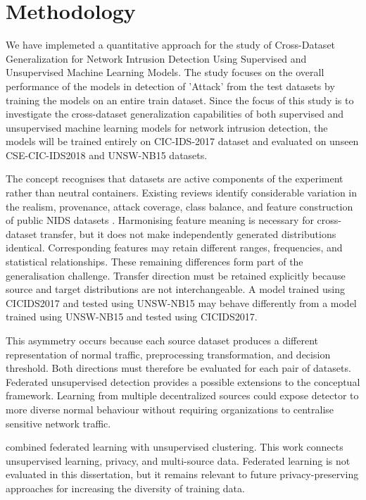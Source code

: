 \chapter{Methodology}
We have implemeted a quantitative approach for the study of Cross-Dataset Generalization for Network Intrusion Detection Using Supervised and Unsupervised Machine Learning Models. 
The study focuses on the overall performance of the models in detection of 'Attack' from the test datasets by training the models on an entire train dataset. Since the focus of this 
study is to investigate the cross-dataset generalization capabilities of both supervised and unsupervised machine learning models for network intrusion detection, the models will be 
trained entirely on CIC-IDS-2017 dataset and evaluated on unseen CSE-CIC-IDS2018 and UNSW-NB15 datasets.

The concept recognises that datasets are active components of the experiment rather than neutral containers. Existing reviews identify 
considerable variation in the realism, provenance, attack coverage, class balance, and feature construction of public NIDS datasets 
\cite{Ring2019,Thakkar2020,Kenyon2020,Goldschmidt2025,Pinto2025}. Harmonising feature meaning is necessary for cross-dataset transfer, 
but it does not make independently generated distributions identical. Corresponding features may retain different ranges, frequencies, 
and statistical relationships. These remaining differences form part of the generalisation challenge. Transfer direction must be retained 
explicitly because source and target distributions  are not interchangeable. A model trained using CICIDS2017 and tested using UNSW-NB15 
may behave differently from a model trained using UNSW-NB15 and tested using CICIDS2017.

This asymmetry occurs because each source dataset produces a different representation of normal traffic, preprocessing transformation, and 
decision threshold. Both directions must therefore be evaluated for each pair of datasets. Federated unsupervised detection provides a 
possible extensions to the conceptual framework. Learning from multiple decentralized sources could expose detector to more diverse normal 
behaviour without requiring organizations to centralise sensitive network traffic.

\cite{Gourceyraud2025} combined federated learning with unsupervised clustering. This work connects unsupervised learning, privacy, and 
multi-source data. Federated learning is not evaluated in this dissertation, but it remains relevant to future privacy-preserving approaches 
for increasing the diversity of training data.

